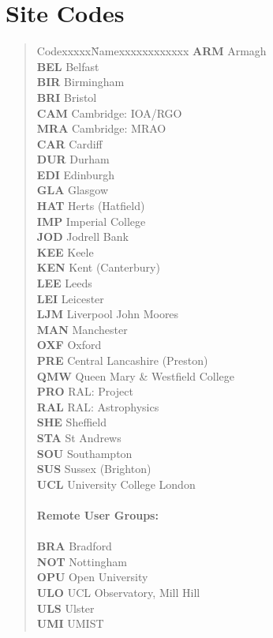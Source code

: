 \documentclass[twoside,11pt]{article}
\begin{document}
\newpage

\section{\label{sitecodes}Site Codes}

\begin{quote}
\begin{tabbing}
Codexxxxx\=Namexxxxxxxxxxxx\kill
{\bf ARM} \> Armagh \\
{\bf BEL} \> Belfast \\
{\bf BIR} \> Birmingham \\
{\bf BRI} \> Bristol \\
{\bf CAM} \> Cambridge: IOA/RGO \\
{\bf MRA} \> Cambridge: MRAO \\
{\bf CAR} \> Cardiff \\
{\bf DUR} \> Durham \\
{\bf EDI} \> Edinburgh \\
{\bf GLA} \> Glasgow \\
{\bf HAT} \> Herts (Hatfield) \\
{\bf IMP} \> Imperial College \\
{\bf JOD} \> Jodrell Bank \\
{\bf KEE} \> Keele \\
{\bf KEN} \> Kent (Canterbury) \\
{\bf LEE} \> Leeds \\
{\bf LEI} \> Leicester \\
{\bf LJM} \> Liverpool John Moores \\
{\bf MAN} \> Manchester \\
{\bf OXF} \> Oxford \\
{\bf PRE} \> Central Lancashire (Preston) \\
{\bf QMW} \> Queen Mary \& Westfield College \\
{\bf PRO} \> RAL: Project \\
{\bf RAL} \> RAL: Astrophysics \\
{\bf SHE} \> Sheffield \\
{\bf STA} \> St Andrews \\
{\bf SOU} \> Southampton \\
{\bf SUS} \> Sussex (Brighton) \\
{\bf UCL} \> University College London \\
\\
{\bf Remote User Groups:} \\
\\
{\bf BRA} \> Bradford \\
{\bf NOT} \> Nottingham \\
{\bf OPU} \> Open University \\
{\bf ULO} \> UCL Observatory, Mill Hill\\
{\bf ULS} \> Ulster\\
{\bf UMI} \> UMIST
\end{tabbing}
\end{quote}
\end{document}
